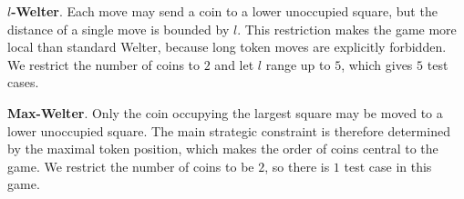 \documentclass[review]{elsarticle}
\newcommand{\set}[1]{\{ #1 \}}
\newcommand{\tuple}[1]{\langle {#1} \rangle}
\newcommand{\true}{\top}
\newcommand{\statevar}{\mathcal{X}}
\newcommand{\act}{\mathcal{A}}
\newcommand{\constraint}{\mathcal{C}}
\newcommand{\estate}{\mathcal{E}}
\newcommand{\pre}{\mathtt{pre}}
\newcommand{\eff}{\mathtt{eff}}
\begin{document}
{\color{red}\textbf{$l$-Welter}. Each move may send a coin to a lower unoccupied square, but the distance of a single move is bounded by $l$.}
{\color{red}This restriction makes the game more local than standard Welter, because long token moves are explicitly forbidden.}
{\color{red}We restrict the number of coins to $2$ and let $l$ range up to $5$, which gives $5$ test cases.}

{\color{red}\textbf{Max-Welter}. Only the coin occupying the largest square may be moved to a lower unoccupied square.}
{\color{red}The main strategic constraint is therefore determined by the maximal token position, which makes the order of coins central to the game.}
{\color{red}We restrict the number of coins to be $2$, so there is $1$ test case in this game.}
\end{document}
